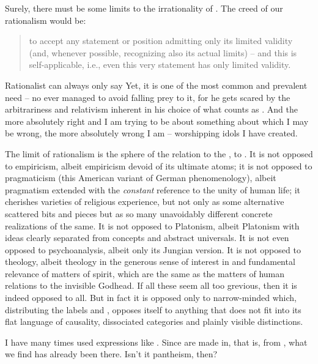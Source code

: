 Surely, there must be some limits to the irrationality of
.  The creed of our rationalism would be:
%
\begin{quote}
to accept any statement or position admitting only its
limited validity (and, whenever possible, recognizing also its actual
limits) -- and this is self-applicable, i.e., even this very statement
has only limited validity.  
\end{quote}
%
Rationalist can always only say 
Yet, it is one of the most common and prevalent need 
-- no  ever managed to avoid falling prey to it, for
he gets scared by the arbitrariness and relativism inherent in his
choice of what counts as .  And the more absolutely
right and  I am trying to be about something about which
I may be wrong, the more absolutely wrong I am -- worshipping idols I
have created.

The limit of rationalism is the sphere of the  relation
to the , to .  It is not
opposed to empiricism, albeit empiricism devoid of its ultimate atoms;
it is not opposed to pragmaticism (this American variant of German 
phenomenology), albeit pragmatism extended with the
{\em constant} reference to the unity of human life; it
cherishes varieties of religious experience, but not only as some
alternative scattered bits and pieces but as so many unavoidably
different concrete realizations of the same.  It is not opposed to
Platonism, albeit Platonism with ideas clearly separated from concepts
and abstract universals.  It is not even opposed to psychoanalysis,
albeit only its Jungian version.  It is not opposed to theology,
albeit theology in the generous sense of interest in and fundamental
relevance of matters of spirit, which are the same as the matters of
human relations to the invisible Godhead.  If all these 
seem all too grevious, then it is indeed opposed to all.  But in fact
it is opposed only to narrow-minded  which,
distributing the labels  and , opposes
itself to anything that does not fit into its flat language of
causality, dissociated categories and plainly visible distinctions.


\pa I have many times used expressions like .  Since  are made in, that is, from
, what we find has already been there.  Isn't it
pantheism, then? 

